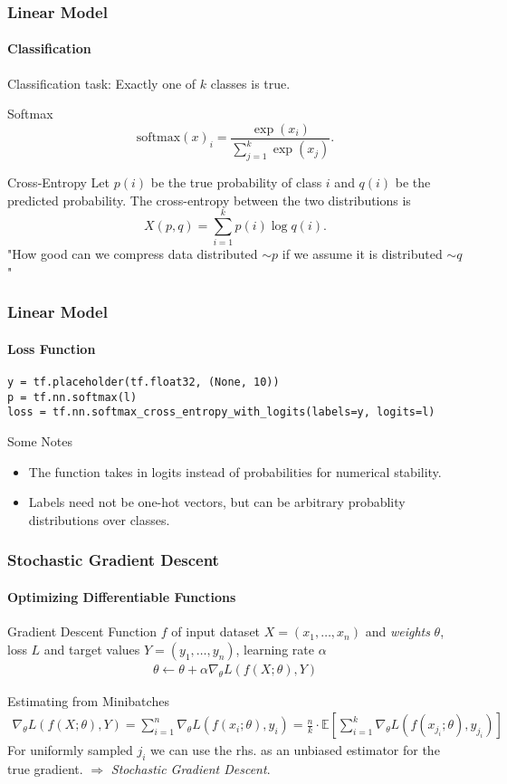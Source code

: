 \begin{frame}
    \frametitle{Linear Model}
    \framesubtitle{Classification}
    Classification task: Exactly one of $k$ classes is true.
    \begin{block}{Softmax}
        \[
            \mathrm{softmax}(x)_i = \frac{\exp(x_i)}{\sum_{j=1}^k \exp(x_j)}.
        \]
    \end{block}
    \begin{block}{Cross-Entropy}
    Let $p(i)$ be the true probability of class $i$ and $q(i)$ be the predicted probability.
    The cross-entropy between the two distributions is
    \[
        X(p, q) = \sum_{i=1}^{k} p(i) \log q(i).
    \]
    "How good can we compress data distributed $\sim p$ if we assume it is distributed $\sim q$"
    \end{block}
\end{frame}

\begin{frame}[fragile]
    \frametitle{Linear Model}
    \framesubtitle{Loss Function}
    \begin{lstlisting}
y = tf.placeholder(tf.float32, (None, 10))
p = tf.nn.softmax(l)
loss = tf.nn.softmax_cross_entropy_with_logits(labels=y, logits=l)
    \end{lstlisting}
    \begin{block}{Some Notes}
        \begin{itemize}
            \item The function takes in logits instead of probabilities for numerical stability.
            \item Labels need not be one-hot vectors, but can be arbitrary probablity distributions over classes.
        \end{itemize}
    \end{block}
\end{frame}

\begin{frame}
    \frametitle{Stochastic Gradient Descent}
    \framesubtitle{Optimizing Differentiable Functions}
    \begin{block}{Gradient Descent}
        Function $f$ of input dataset $X=(x_1, \ldots, x_n)$ and \emph{weights} $\theta$, loss $L$ and target values $Y=(y_1, \ldots, y_n)$, learning rate $\alpha$
        \begin{align}
            \theta \leftarrow \theta + \alpha \nabla_\theta L(f(X; \theta), Y)
        \end{align}
    \end{block}
    \begin{block}{Estimating from Minibatches}
        \begin{align*}
            \nabla_\theta L(f(X; \theta), Y) = \sum_{i=1}^{n} \nabla_\theta L(f(x_i; \theta), y_i) = \frac{n}{k} \cdot \mathbb{E}\left[\sum_{i=1}^{k} \nabla_\theta L(f(x_{j_i}; \theta), y_{j_i})\right]
        \end{align*}
        For uniformly sampled $j_i$ we can use the rhs. as an unbiased estimator for the true gradient. 
        $\Rightarrow$ \emph{Stochastic Gradient Descent}.
    \end{block}
\end{frame}

